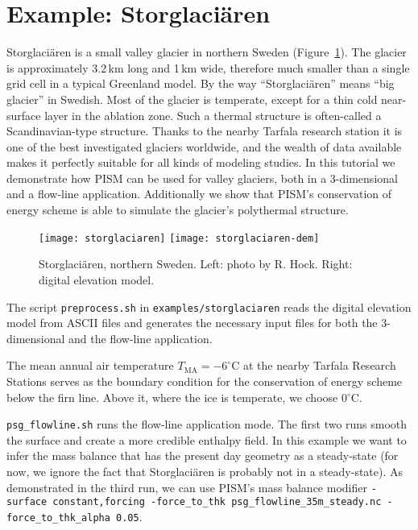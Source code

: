 
\section{Example: Storglaci{\"a}ren}\label{sec:storglaciaren} 

Storglaci{\"a}ren is a small valley glacier in northern Sweden (Figure~\ref{fig:storglaciaren}). The glacier is approximately 3.2\,km long and 1\,km wide, therefore much smaller than a single grid cell in a typical Greenland model. By the way ``Storglaci{\"a}ren'' means ``big glacier'' in Swedish. Most of the glacier is temperate, except for a thin cold near-surface layer in the ablation zone. Such a thermal structure is often-called a Scandinavian-type structure. Thanks to the nearby Tarfala research station it is one of the best investigated glaciers worldwide, and the wealth of data available makes it perfectly suitable for all kinds of modeling studies. In this tutorial we demonstrate how PISM can be used for valley glaciers, both in a 3-dimensional and a flow-line application. Additionally we show that PISM's conservation of energy scheme is able to simulate the glacier's polythermal structure.

\begin{figure}[ht]
  \centering
  \texttt{[image: storglaciaren]}\qquad
  \texttt{[image: storglaciaren-dem]}
  \caption{Storglaci{\"a}ren, northern Sweden. Left: photo by R. Hock. Right: digital elevation model.}
  \label{fig:storglaciaren}
\end{figure}

The script \texttt{preprocess.sh} in \texttt{examples/storglaciaren} reads the digital elevation model from ASCII files and generates the necessary input files for both the 3-dimensional and the flow-line application. 

The mean annual air temperature $T_{\mathrm{MA}}=-6^{\circ}$C at the nearby Tarfala Research Stations serves as the boundary condition for the conservation of energy scheme below the firn line. Above it, where the ice is temperate, we choose 0$^{\circ}$C. 

\texttt{psg_flowline.sh} runs the flow-line application mode. The first two runs smooth the surface and create a more credible enthalpy field. In this example we want to infer the mass balance that has the present day geometry as a steady-state (for now, we ignore the fact that Storglaci{\"a}ren is probably not in a steady-state). As demonstrated in the third run, we can use PISM's mass balance modifier \texttt{-surface constant,forcing -force_to_thk psg_flowline_35m_steady.nc -force_to_thk_alpha 0.05}.

